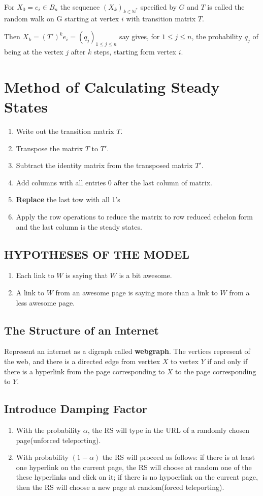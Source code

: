 \documentclass{article}
\begin{document}
\begin{spacing}{1.5}
For $X_0=e_i \in B_n$ the sequence $(X_k)_{k \in \mathbb{N^*}} $
specified by $G$ and $T$ is called the random walk on G starting at vertex $i$ with transition matrix $T$. 

Then $X_k = (T')^k e_i = (q_j)_{1 \le j \le n}$ say gives, for $1 \le j \le n$, the probability $q_j$ of being at the vertex $j$ after $k$ steps, starting form vertex $i$. 
\section{Method of Calculating Steady States}
\begin{enumerate}
    \item Write out the transition matrix $T$. 
    \item Transpose the matrix $T$ to $T'$.
    \item Subtract the identity matrix from the transposed matrix $T'$. 
    \item Add columns with all entries 0 after the last column of matrix. 
    \item \textbf{Replace} the last tow with all 1's
    \item Apply the row operations to reduce the matrix to row reduced echelon form and the last column is the steady states. 
\end{enumerate}
\subsection{HYPOTHESES OF THE MODEL}
\begin{enumerate}
    \item Each link to $W$ is saying that $W$ is a bit awesome.
    \item A link to $W$ from an awesome page is saying more than a link to $W$ from a less awesome page.  
\end{enumerate}
\subsection{The Structure of an Internet}
Represent an internet as a digraph called \textbf{webgraph}. The vertices represent of the web, and there is a directed edge from verttex $X$ to vertex $Y$ if and only if there is a hyperlink from the page corresponding to $X$ to the page corresponding to $Y$. 
\subsection{Introduce Damping Factor}
\begin{enumerate}
    \item With the probability $\alpha$, the RS will type in the URL of a randomly chosen page(unforced teleporting).
    \item With probability $(1-\alpha)$ the RS will proceed as follows: if there is at least one hyperlink on the current page, the RS will choose at random one of the these hyperlinks and click on it; if there is no hypoerlink on the current page, then the RS will choose a new page at random(forced teleporting).
\end{enumerate}

\end{spacing}
\end{document}
